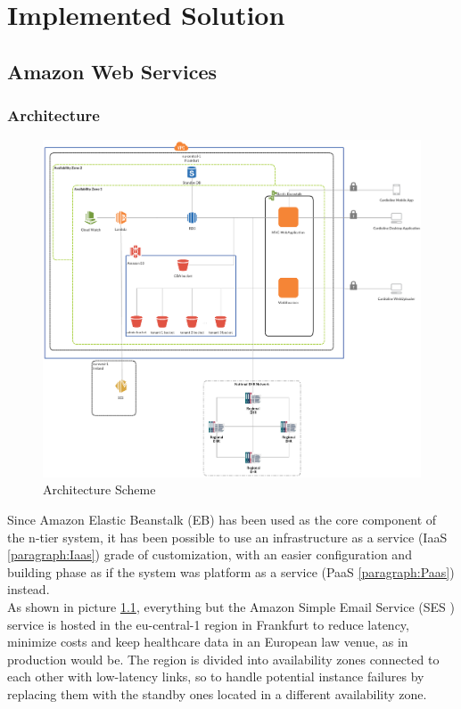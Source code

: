 \chapter{Implemented Solution}
\section{Amazon Web Services}

\subsection{Architecture}
\begin{figure}[h]
    \includegraphics[width=\textwidth]{img/architecture}
    \caption{Architecture Scheme}
    \label{fig:architecture}
\end{figure}
Since Amazon Elastic Beanstalk (EB) has been used as the core component of the n-tier system, it has been possible to use an infrastructure as a service (IaaS \ref{paragraph:Iaas}) grade of customization, with an easier configuration and building phase as if the system was platform as a service (PaaS \ref{paragraph:Paas}) instead.\\
As shown in picture \ref{fig:architecture}, everything but the Amazon Simple Email Service (SES \cite{AmazonSes}) service is hosted in the eu-central-1 region in Frankfurt to reduce latency, minimize costs and keep healthcare data in an European law venue, as in production would be.
The region is divided into availability zones connected to each other with low-latency links, so to handle potential instance failures by replacing them with the standby ones located in a different availability zone.\\
